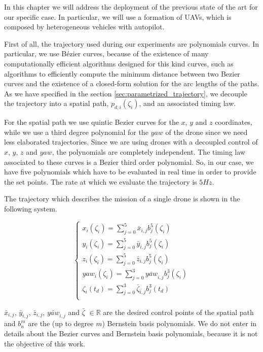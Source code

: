 In this chapter we will address the deployment of the previous state of the art
for our specific case. In particular, we will use a formation of UAVs, which is
composed by heterogeneous vehicles with autopilot.

First of all, the trajectory used during our experiments are polynomials curves.
In particular, we use Bézier curves, because of the existence of many
computationally efficient algorithms designed for this kind curves,
such as algorithms to efficiently compute the minimum distance between two Bezier curves
and the existence of a closed-form solution for the arc lengths of the paths.
As we have specified in the section \ref{sec:parametrized_trajectory}, we decouple the
trajectory into a spatial path, $p_{d,i}(\zeta_i)$, and an associated timing law.

For the spatial path we use quintic Bezier curves for the $x$, $y$ and $z$ coordinates,
while we use a third degree polynomial for the $yaw$ of the drone since we need less
elaborated trajectories.
Since we are using drones with a decoupled control of $x$, $y$, $z$ and $yaw$, the
polynomials are completely independent.
The timing law associated to these curves is a Bezier third order polynomial.
So, in our case, we have five polynomials which have to be evaluated in real time
in order to provide the set points. The rate at which we evaluate the trajectory
is $5 Hz$.

The trajectory which describes the mission of a single drone is shown in the
following system.

\[
  \begin{cases}
    x_i(\zeta_i) = \sum_{j=0}^{5}{\bar{x}_{i,j} b_j^5(\zeta_i)}\\
    y_i(\zeta_i) = \sum_{j=0}^{5}{\bar{y}_{i,j} b_j^5(\zeta_i)}\\
    z_i(\zeta_i) = \sum_{j=0}^{5}{\bar{z}_{i,j} b_j^5(\zeta_i)}\\
    yaw_i(\zeta_i) = \sum_{j=0}^{3}{\bar{yaw}_{i,j} b_j^3(\zeta_i)}\\
    \zeta_i(t_d) = \sum_{j=0}^{3}{\bar{\zeta}_{i,j} b_j^3(t_d)}\\
  \end{cases}
\]

$\bar{x}_{i,j}$, $\bar{y}_{i,j}$, $\bar{z}_{i,j}$, $\bar{yaw}_{i,j}$ and $\bar{\zeta}$ $\in \mathbb{R}$
are the desired control points of the spatial path and $b_n^m$ are the (up to degree $m$)
Bernstein basis polynomials.
We do not enter in details about the Bezier curves and Bernstein basis polynomials,
because it is not the objective of this work.
